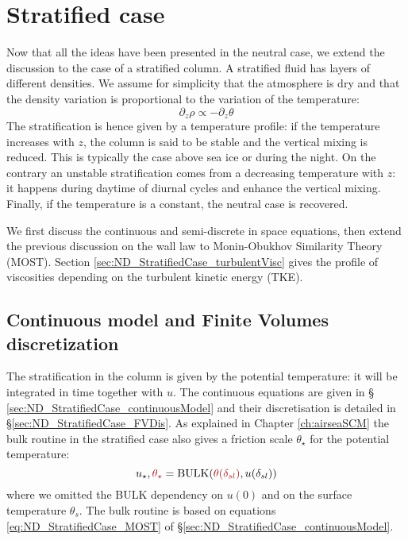 \section{Stratified case}
\label{sec:ND_StratifiedCase}
Now that all the ideas have been presented in the neutral case,
we extend the discussion to the case of a stratified column.
A stratified fluid has layers of different densities.
We assume for simplicity that the atmosphere
is dry and that the density variation is
proportional to the variation of the temperature:
\begin{equation}
	\partial_z \rho \propto
	- \partial_z \theta
\end{equation}
The stratification is hence given by a temperature profile:
if the temperature increases with $z$, the column is said
to be stable and the vertical mixing is reduced. This is
typically the case above sea ice or during the night.
On the contrary an unstable stratification comes from
a decreasing temperature with $z$: it happens
during daytime of diurnal cycles and enhance the
vertical mixing.
%
Finally, if the temperature is a constant, the neutral case is
recovered.
\par
We first discuss the continuous and semi-discrete in space
equations, then extend the previous discussion on the wall law to
Monin-Obukhov Similarity Theory (MOST).
Section \ref{sec:ND_StratifiedCase_turbulentVisc} gives the
profile of viscosities depending on the turbulent kinetic energy
(TKE).
\subsection{Continuous model and Finite Volumes discretization}
The stratification in the column is given by the
potential temperature: it will be integrated in time
together with $u$.
The continuous equations are given in \S
\ref{sec:ND_StratifiedCase_continuousModel}
and their discretisation is detailed in
\S \ref{sec:ND_StratifiedCase_FVDis}.
As explained in Chapter \ref{ch:airseaSCM}
the bulk routine in the stratified case
also gives a friction scale $\theta_\star$
for the potential temperature:
\begin{equation}
	u_\star, \emphase{\theta_\star} =
	{\rm BULK}(\emphase{\theta(\delta_{sl})},
	u(\delta_{sl}))
\end{equation}
where we omitted the BULK dependency on
$u(0)$ and on the surface temperature $\theta_s$.
The bulk routine is based on equations
\eqref{eq:ND_StratifiedCase_MOST} of
\S \ref{sec:ND_StratifiedCase_continuousModel}.
